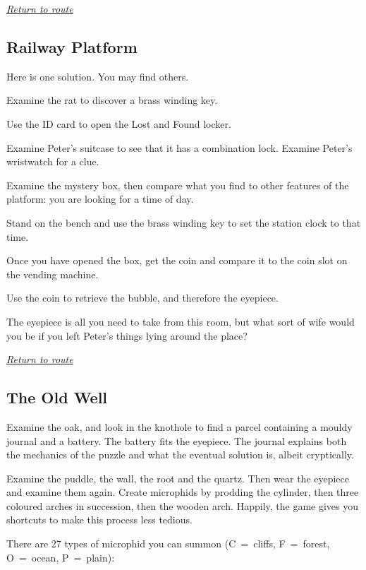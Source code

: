 \documentclass[a5paper]{extarticle}
\begin{document}
\hyperref[sec:route-1]{\emph{Return to route}}

\newpage
\subsection{Railway Platform}\label{sec:sol-Railway-Platform}

Here is one solution. You may find others.

Examine the rat to discover a brass winding key.

Use the ID card to open the Lost and Found locker.

Examine Peter's suitcase to see that it has a combination lock.
Examine Peter's wristwatch for a clue.

Examine the mystery box, then compare what you find to other features of the platform:
you are looking for a time of day.

Stand on the bench and use the brass winding key to set the station clock to that time.

Once you have opened the box, get the coin and compare it to the coin slot on the vending machine.

Use the coin to retrieve the bubble, and therefore the eyepiece.

The eyepiece is all you need to take from this room,
but what sort of wife would you be if you left Peter's things lying around the place?

\hyperref[sec:route-2]{\emph{Return to route}}

\newpage
\subsection{The Old Well}\label{sec:sol-The-Old-Well}

Examine the oak, and look in the knothole to find a parcel containing a mouldy journal and a battery.
The battery fits the eyepiece.
The journal explains both the mechanics of the puzzle and what the eventual solution is,
albeit cryptically.

Examine the puddle, the wall, the root and the quartz.
Then wear the eyepiece and examine them again.
Create microphids by prodding the cylinder,
then three coloured arches in succession, then the wooden arch.
Happily, the game gives you shortcuts to make this process less tedious.

There are 27 types of microphid you can summon (C~=~cliffs, F~=~forest, O~=~ocean, P~=~plain):
\end{document}
